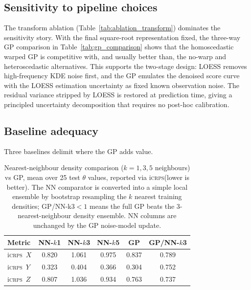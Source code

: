 \documentclass[12pt,a4paper]{article}
\newcommand{\iCRPS}{i\textsc{crps}}
\newcommand{\spar}{\theta}
\begin{document}
\subsection{Sensitivity to pipeline choices}
\label{sec:sensitivity}

The transform ablation (Table~\ref{tab:ablation_transform}) dominates
the sensitivity story.  With the final square-root representation fixed,
the three-way GP comparison in Table~\ref{tab:gp_comparison} shows that
the homoscedastic warped GP is competitive with, and usually better
than, the no-warp and heteroscedastic alternatives.  This supports the
two-stage design: LOESS removes high-frequency KDE noise first, and the
GP emulates the denoised score curve with the LOESS estimation
uncertainty as fixed known observation noise.  The residual variance
stripped by LOESS is restored at prediction time, giving a principled
uncertainty decomposition that requires no post-hoc calibration.

\subsection{Baseline adequacy}
\label{sec:benchmarks}

Three baselines delimit where the GP adds value.

\begin{table}[htbp]
  \centering
  \caption{Nearest-neighbour density comparison ($k=1,3,5$ neighbours)
           vs GP, mean over 25 test $\spar$ values, reported via
           \iCRPS (lower is better).  The NN comparator is converted
           into a simple local ensemble by bootstrap resampling the
           $k$ nearest training densities; GP/NN-k3$<1$ means the full
           GP beats the 3-nearest-neighbour density ensemble.  NN
           columns are unchanged by the GP noise-model update.}
  \label{tab:nn_comparator}
  \setlength{\tabcolsep}{4pt}
  \begin{tabular}{lccccc}
    \toprule
    Metric & NN-$k$1 & NN-$k$3 & NN-$k$5 & GP & GP/NN-$k$3 \\
    \midrule
    \iCRPS\ $X$      & 0.820 & 1.061 & 0.975 & 0.837 & 0.789 \\
    \iCRPS\ $Y$      & 0.323 & 0.404 & 0.366 & 0.304 & 0.752 \\
    \iCRPS\ $Z$      & 0.807 & 1.036 & 0.934 & 0.763 & 0.737 \\
    \bottomrule
  \end{tabular}
\end{table}
\end{document}
